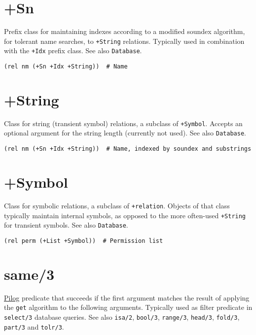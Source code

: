 {{{{{{{{ 
\section{+Sn}
\label{sec-8-1-19-4}


Prefix class for maintaining indexes according to a modified soundex
algorithm, for tolerant name searches, to \texttt{+String} relations. Typically
used in combination with the \texttt{+Idx} prefix class. See also \texttt{Database}.


\begin{verbatim}
(rel nm (+Sn +Idx +String))  # Name
\end{verbatim}

 
\section{+String}
\label{sec-8-1-19-5}


Class for string (transient symbol) relations, a subclass of \texttt{+Symbol}.
Accepts an optional argument for the string length (currently not used).
See also \texttt{Database}.


\begin{verbatim}
(rel nm (+Sn +Idx +String))  # Name, indexed by soundex and substrings
\end{verbatim}

 
\section{+Symbol}
\label{sec-8-1-19-6}


Class for symbolic relations, a subclass of \texttt{+relation}. Objects of that
class typically maintain internal symbols, as opposed to the more
often-used \texttt{+String} for transient symbols. See also \texttt{Database}.


\begin{verbatim}
(rel perm (+List +Symbol))  # Permission list
\end{verbatim}

 
\section{same/3}
\label{sec-8-1-19-7}


\hyperref[ref.html-pilog]{Pilog} predicate that succeeds if the first argument
matches the result of applying the \texttt{get} algorithm to the following
arguments. Typically used as filter predicate in \texttt{select/3} database
queries. See also \texttt{isa/2}, \texttt{bool/3}, \texttt{range/3}, \texttt{head/3}, \texttt{fold/3},
\texttt{part/3} and \texttt{tolr/3}.


}}}}}}}}
